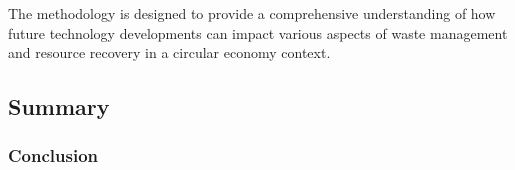       The methodology is designed to provide a comprehensive understanding of how future technology developments can impact various aspects of waste management and resource recovery in a circular economy context.
      



\clearpage

\subsection{Summary}


\clearpage


\clearpage



\clearpage

\clearpage
% 
% 

% 
% 

\subsubsection{Conclusion}




\sectionEndlines
\clearpage
